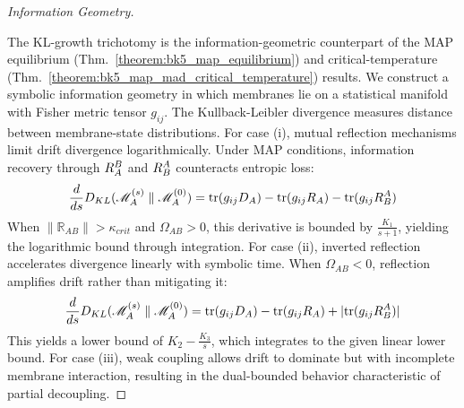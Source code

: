 \begin{proof}[Information Geometry]
\label{proof:bk5_information_geometry_symbolic}
\leavevmode

The KL-growth trichotomy is the information-geometric counterpart
of the MAP equilibrium (Thm.~\ref{theorem:bk5_map_equilibrium}) and
critical-temperature (Thm.~\ref{theorem:bk5_map_mad_critical_temperature}) results.
We construct a symbolic information geometry in which membranes lie on a
statistical manifold with Fisher metric tensor $g_{ij}$.
The Kullback-Leibler divergence measures distance between membrane-state
distributions.
For case (i), mutual reflection mechanisms limit drift divergence logarithmically. Under MAP conditions, information recovery through $R_A^B$ and $R_B^A$ counteracts entropic loss:
\begin{equation}
\frac{d}{ds}D_{KL}(\mathscr{M}_A^{(s)} \parallel \mathscr{M}_A^{(0)}) = \text{tr}(g_{ij}D_A) - \text{tr}(g_{ij}R_A) - \text{tr}(g_{ij}R_B^A)
\end{equation}
When $\|\mathbb{R}_{AB}\| > \kappa_{crit}$ and $\Omega_{AB} > 0$, this derivative is bounded by $\frac{K_1}{s+1}$, yielding the logarithmic bound through integration.
For case (ii), inverted reflection accelerates divergence linearly with symbolic time. When $\Omega_{AB} < 0$, reflection amplifies drift rather than mitigating it:
\begin{equation}
\frac{d}{ds}D_{KL}(\mathscr{M}_A^{(s)} \parallel \mathscr{M}_A^{(0)}) = \text{tr}(g_{ij}D_A) - \text{tr}(g_{ij}R_A) + |\text{tr}(g_{ij}R_B^A)|
\end{equation}
This yields a lower bound of $K_2 - \frac{K_3}{s}$, which integrates to the given linear lower bound.
For case (iii), weak coupling allows drift to dominate but with incomplete membrane interaction, resulting in the dual-bounded behavior characteristic of partial decoupling.
\end{proof}
